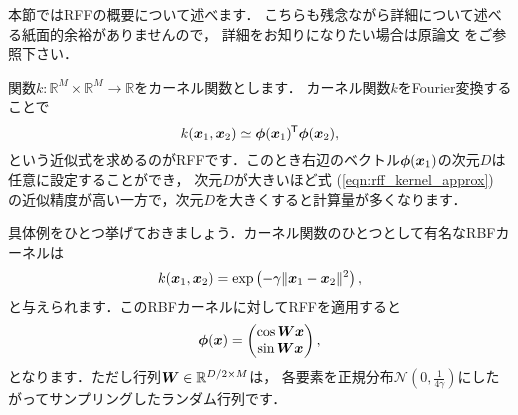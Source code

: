 %

本節ではRFFの概要について述べます．
こちらも残念ながら詳細について述べる紙面的余裕がありませんので，
詳細をお知りになりたい場合は原論文 \cite{Rahimi2007} をご参照下さい．

関数$k: \mathbb{R}^M \times \mathbb{R}^M \to \mathbb{R}$をカーネル関数とします．
カーネル関数$k$をFourier変換することで
\begin{equation}
    k(\boldsymbol{x}_1, \boldsymbol{x}_2) \simeq \boldsymbol{\phi}({\boldsymbol{x}_1})^{\mkern-1.5mu\mathsf{T}} \boldsymbol{\phi}({\boldsymbol{x}_2}),
    \label{eqn:rff_kernel_approx}
\end{equation}
という近似式を求めるのがRFFです．このとき右辺のベクトル$\boldsymbol{\phi}(\boldsymbol{x}_1)$の次元$D$は任意に設定することができ，
次元$D$が大きいほど式 (\ref{eqn:rff_kernel_approx}) の近似精度が高い一方で，次元$D$を大きくすると計算量が多くなります．

具体例をひとつ挙げておきましょう．カーネル関数のひとつとして有名なRBFカーネルは
\begin{equation}
    k(\boldsymbol{x}_1, \boldsymbol{x}_2) = \exp \left( - \gamma \| \boldsymbol{x}_1 - \boldsymbol{x}_2 \|^2 \right),
\end{equation}
と与えられます．このRBFカーネルに対してRFFを適用すると
\begin{equation}
    \boldsymbol{\phi}(\boldsymbol{x}) = \begin{pmatrix}
        \cos \boldsymbol{Wx} \\
        \sin \boldsymbol{Wx}
    \end{pmatrix},
\end{equation}
となります．ただし行列$\boldsymbol{W} \in \mathbb{R}^{D/2 \times M}$は，
各要素を正規分布$\mathcal{N}(0, \frac{1}{4 \gamma})$にしたがってサンプリングしたランダム行列です．

